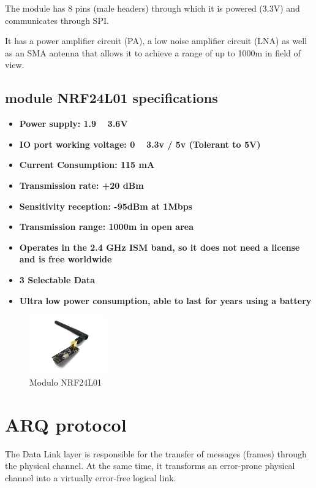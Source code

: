 \documentclass[journal,trans]{IEEEtran}
\begin{document}
The module has 8 pins (male headers) through which it is powered (3.3V) and communicates through SPI.

It has a power amplifier circuit (PA), a low noise amplifier circuit (LNA) as well as an SMA antenna that allows it to achieve a range of up to 1000m in field of view.

\subsection{\textbf{module NRF24L01 specifications }}
\begin{itemize}
  \item \textbf{Power supply: 1.9 ~ 3.6V}
    \item \textbf{ IO port working voltage: 0 ~ 3.3v / 5v (Tolerant to 5V)}
  \item \textbf{Current Consumption: 115 mA}
  \item \textbf{ Transmission rate: +20 dBm}
  \item \textbf{ Sensitivity reception: -95dBm at 1Mbps} 
  \item \textbf{ Transmission range: 1000m in open area} 
  \item \textbf{Operates in the 2.4 GHz ISM band, so it does not need a license and is free worldwide} 
    \item \textbf{3 Selectable Data } 
    \item \textbf{ Ultra low power consumption, able to last for years using a battery} 

\end{itemize}

\begin{figure}[h]
    \includegraphics[width=0.3\textwidth]{Modulo.jpg}
    \centering
    \caption{Modulo NRF24L01}
    \label{fig:my_label1}
\end{figure}

\section{\textbf{ARQ protocol}}
The Data Link layer is responsible for the transfer of messages (frames) through the physical channel. At the same time, it transforms an error-prone physical channel into a virtually error-free logical link.\cite{zambrano2015estudio}
\end{document}
